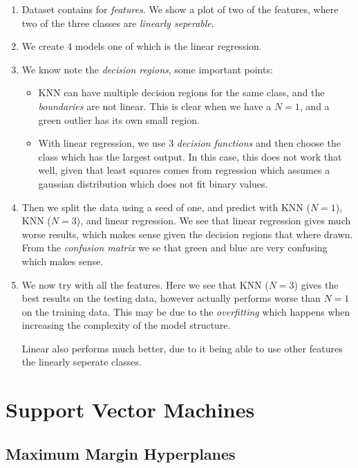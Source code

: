 \begin{enumerate}
    \item Dataset contains for \emph{features}. We show a plot of two of the features, where two of the three classes are \emph{linearly seperable}.
    \item We create 4 models one of which is the linear regression.
    \item We know note the \emph{decision regions}, some important points:
        \begin{itemize}
            \item KNN can have multiple decision regions for the same class, and the \emph{boundaries} are not linear.
                This is clear when we have a $N=1$, and a green outlier has its own small region.
            \item With linear regression, we use 3 \emph{decision functions} and then choose the class which has the largest output.
                In this case, this does not work that well, given that least squares comes from regression which assumes a gaussian distribution which does not fit binary values.
        \end{itemize}
    \item Then we split the data using a seed of one, and predict with KNN ($N=1$), KNN ($N=3$), and linear regression.
        We see that linear regression gives much worse results, which makes sense given the decision regions that where drawn.
        From the \emph{confusion matrix} we se that green and blue are very confusing which makes sense.
    \item We now try with all the features.
        Here we see that KNN ($N=3$) gives the best results on the testing data, however actually performs worse than $N=1$ on the training data.
        This may be due to the \emph{overfitting} which happens when increasing the complexity of the model structure.

        Linear also performs much better, due to it being able to use other features the linearly seperate classes.
\end{enumerate}


\section{Support Vector Machines}

\subsection{Maximum Margin Hyperplanes}

